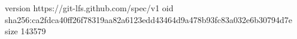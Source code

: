 version https://git-lfs.github.com/spec/v1
oid sha256:ca2fdca40ff26f78319aa82a6123edd43464d9a478b93fc83a032e6b30794d7e
size 143579
